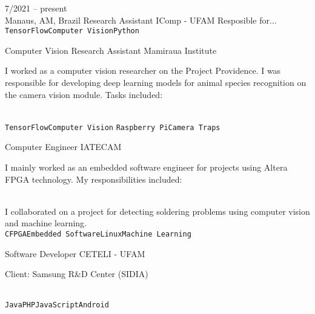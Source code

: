 \documentclass[10pt]{developercv} %
\begin{document}
\begin{entrylist}
  \entry
  {7/2021 -- present\\\footnotesize{Manaus, AM, Brazil}}
  {Research Assistant}
  {IComp - UFAM}
  {Resposible for...\\
\texttt{TensorFlow}\slashsep\texttt{Computer Vision}\slashsep\texttt{Python}}

  {Computer Vision Research Assistant}
  {Mamiraua Institute}
  {
    I worked as a computer vision researcher on the Project Providence. I was 
responsible for developing deep learning models for animal species recognition 
on the camera vision module. Tasks included:\\
    \begin{contributionlist}
    \end{contributionlist}\\
\texttt{TensorFlow}\slashsep\texttt{Computer Vision}
\slashsep\texttt {Raspberry Pi}\slashsep\texttt{Camera Traps}}
  
  {Computer Engineer}
  {IATECAM}
  {
    I mainly worked as an embedded software engineer for projects using Altera 
FPGA technology. My responsibilities included:\\
    \begin{contributionlist}
    \end{contributionlist}\\
    I collaborated on a project for detecting soldering problems using computer 
vision and machine learning.\\
    \texttt{C}\slashsep\texttt{FPGA}\slashsep\texttt{Embedded 
Software}\slashsep\texttt{Linux}\slashsep\texttt{Machine Learning}}
  
  {Software Developer}
  {CETELI - UFAM}
  {
    Client: Samsung R\&D Center (SIDIA)\\
    \begin{contributionlist}
    \end{contributionlist}\\
    \texttt{Java}\slashsep\texttt{PHP}\slashsep\texttt{JavaScript}\slashsep\texttt{Android}}


\end{entrylist}
\end{document}
